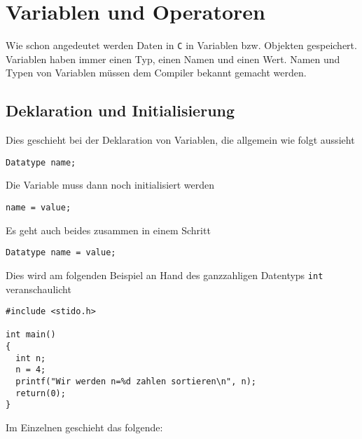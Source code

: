 \section{Variablen und Operatoren}

Wie schon angedeutet werden Daten in \texttt{C} in Variablen bzw. Objekten gespeichert.
Variablen haben immer einen Typ, einen Namen und einen Wert.
Namen und Typen von Variablen müssen dem Compiler bekannt gemacht werden.

\subsection{Deklaration und Initialisierung}

Dies geschieht bei der Deklaration von Variablen, die allgemein wie folgt aussieht
\begin{lstlisting}
Datatype name;
\end{lstlisting}
Die Variable muss dann noch initialisiert werden
\begin{lstlisting}
name = value;
\end{lstlisting}
Es geht auch beides zusammen in einem Schritt
\begin{lstlisting}
Datatype name = value;
\end{lstlisting}
Dies wird am folgenden Beispiel an Hand des ganzzahligen Datentyps \texttt{int} veranschaulicht
\begin{lstlisting}[caption={Erste Variablendeklaration und -zuweisung}, belowcaptionskip=0.3em]
#include <stido.h>

int main()
{
  int n;
  n = 4;
  printf("Wir werden n=%d zahlen sortieren\n", n);
  return(0);
}
\end{lstlisting}
Im Einzelnen geschieht das folgende:
